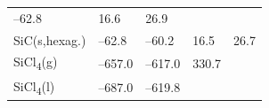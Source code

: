 \documentclass[
  9pt,
]{extbook}
\theoremstyle{definition}
\theoremstyle{definition}
\theoremstyle{definition}
\theoremstyle{remark}
\begin{document}
\begin{longtable}[]{@{}lllll@{}}
\begin{minipage}[t]{0.20\columnwidth}
--62.8\strut
\end{minipage} & \begin{minipage}[t]{0.18\columnwidth}\raggedright
16.6\strut
\end{minipage} & \begin{minipage}[t]{0.18\columnwidth}\raggedright
26.9\strut
\end{minipage}\tabularnewline
\begin{minipage}[t]{0.10\columnwidth}\raggedright
SiC(s,hexag.)\strut
\end{minipage} & \begin{minipage}[t]{0.19\columnwidth}\raggedright
--62.8\strut
\end{minipage} & \begin{minipage}[t]{0.20\columnwidth}\raggedright
--60.2\strut
\end{minipage} & \begin{minipage}[t]{0.18\columnwidth}\raggedright
16.5\strut
\end{minipage} & \begin{minipage}[t]{0.18\columnwidth}\raggedright
26.7\strut
\end{minipage}\tabularnewline
\begin{minipage}[t]{0.10\columnwidth}\raggedright
SiCl\textsubscript{4}(g)\strut
\end{minipage} & \begin{minipage}[t]{0.19\columnwidth}\raggedright
--657.0\strut
\end{minipage} & \begin{minipage}[t]{0.20\columnwidth}\raggedright
--617.0\strut
\end{minipage} & \begin{minipage}[t]{0.18\columnwidth}\raggedright
330.7\strut
\end{minipage} & \begin{minipage}[t]{0.18\columnwidth}\raggedright
\strut
\end{minipage}\tabularnewline
\begin{minipage}[t]{0.10\columnwidth}\raggedright
SiCl\textsubscript{4}(l)\strut
\end{minipage} & \begin{minipage}[t]{0.19\columnwidth}\raggedright
--687.0\strut
\end{minipage} & \begin{minipage}[t]{0.20\columnwidth}\raggedright
--619.8\strut
\end{minipage} & \begin{minipage}[t]{0.18\columnwidth}\raggedright

\end{minipage}
\end{longtable}
\end{document}
